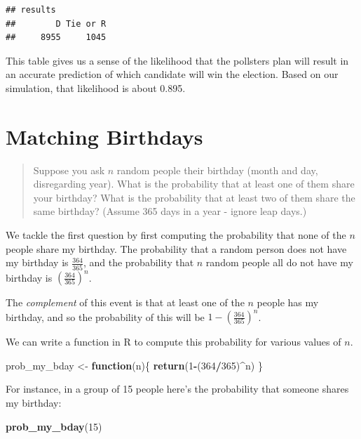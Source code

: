 \documentclass[
]{book}
\newenvironment{Shaded}{\begin{snugshade}}{\end{snugshade}}
\newcommand{\ControlFlowTok}[1]{\textcolor[rgb]{0.13,0.29,0.53}{\textbf{#1}}}
\newcommand{\DecValTok}[1]{\textcolor[rgb]{0.00,0.00,0.81}{#1}}
\newcommand{\FunctionTok}[1]{\textcolor[rgb]{0.13,0.29,0.53}{\textbf{#1}}}
\newcommand{\NormalTok}[1]{#1}
\newcommand{\OtherTok}[1]{\textcolor[rgb]{0.56,0.35,0.01}{#1}}
\newcommand{\SpecialCharTok}[1]{\textcolor[rgb]{0.81,0.36,0.00}{\textbf{#1}}}
\theoremstyle{definition}
\theoremstyle{definition}
\theoremstyle{definition}
\theoremstyle{definition}
\theoremstyle{remark}
\begin{document}
\begin{verbatim}
## results
##        D Tie or R 
##     8955     1045
\end{verbatim}

This table gives us a sense of the likelihood that the pollsters plan will result in an accurate prediction of which candidate will win the election. Based on our simulation, that likelihood is about 0.895.

\section{Matching Birthdays}\label{same-birthday-R}

\begin{quote}
Suppose you ask \(n\) random people their birthday (month and day, disregarding year). What is the probability that at least one of them share your birthday? What is the probability that at least two of them share the same birthday? (Assume 365 days in a year - ignore leap days.)
\end{quote}

We tackle the first question by first computing the probability that none of the \(n\) people share my birthday. The probability that a random person does not have my birthday is \(\frac{364}{365}\), and the probability that \(n\) random people all do not have my birthday is \(\left(\frac{364}{365}\right)^n\).

The \emph{complement} of this event is that at least one of the \(n\) people has my birthday, and so the probability of this will be \(1- \left(\frac{364}{365}\right)^n\).

We can write a function in R to compute this probability for various values of \(n\).

\begin{Shaded}
\begin{Highlighting}[]
\NormalTok{prob\_my\_bday }\OtherTok{\textless{}{-}} \ControlFlowTok{function}\NormalTok{(n)\{}
  \FunctionTok{return}\NormalTok{(}\DecValTok{1}\SpecialCharTok{{-}}\NormalTok{(}\DecValTok{364}\SpecialCharTok{/}\DecValTok{365}\NormalTok{)}\SpecialCharTok{\^{}}\NormalTok{n)}
\NormalTok{\}}
\end{Highlighting}
\end{Shaded}

For instance, in a group of 15 people here's the probability that someone shares my birthday:

\begin{Shaded}
\begin{Highlighting}[]
\FunctionTok{prob\_my\_bday}\NormalTok{(}\DecValTok{15}\NormalTok{)}
\end{Highlighting}
\end{Shaded}
\end{document}

